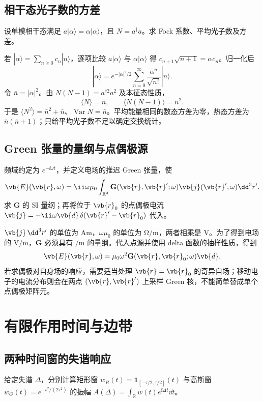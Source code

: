\subsection*{相干态光子数的方差}
设单模相干态满足 \(a|\alpha\rangle=\alpha|\alpha\rangle\)，且 \(N=a^\dagger a\)。求 Fock 系数、平均光子数及方差。

若 \(|\alpha\rangle=\sum_{n\ge0}c_n|n\rangle\)，逐项比较 \(a|\alpha\rangle\) 与 \(\alpha|\alpha\rangle\) 得 \(c_{n+1}\sqrt{n+1}=\alpha c_n\)。归一化后
\[
|\alpha\rangle=e^{-|\alpha|^2/2}
\sum_{n=0}^\infty\frac{\alpha^n}{\sqrt{n!}}|n\rangle.
\]
令 \(\bar n=|\alpha|^2\)。由 \(N(N-1)=a^{\dagger2}a^2\) 及本征态性质，
\[
\langle N\rangle=\bar n,\qquad
\langle N(N-1)\rangle=\bar n^2.
\]
于是 \(\langle N^2\rangle=\bar n^2+\bar n\)、\(\operatorname{Var}N=\bar n\)。平均能量相同的数态方差为零，热态方差为 \(\bar n(\bar n+1)\)；只给平均光子数不足以确定交换统计。

\subsection*{Green 张量的量纲与点偶极源}
频域约定为 \(e^{-\ii\omega t}\)，并定义电场的推迟 Green 张量，使
\[
\vb{E}(\vb{r},\omega)=\ii\omega\mu_0
\int_{\mathbb R^3}\mathbf G(\vb{r},\vb{r}';\omega)
\vb{j}(\vb{r}',\omega)\dd^3r'.
\]
求 \(\mathbf G\) 的 SI 量纲；再将位于 \(\vb{r}_0\) 的点偶极电流 \(\vb{j}=-\ii\omega\vb{d}\,\delta(\vb{r}'-\vb{r}_0)\) 代入。

\(\vb{j}\,\dd^3r'\) 的单位为 \(\si{\ampere\meter}\)，\(\omega\mu_0\) 的单位为 \(\si{\ohm\per\meter}\)，两者相乘是 \(\si{\volt}\)。为了得到电场的 \(\si{\volt\per\meter}\)，\(\mathbf G\) 必须具有 \(\si{\per\meter}\) 的量纲。代入点源并使用 delta 函数的抽样性质，得到
\[
\vb{E}(\vb{r},\omega)=\mu_0\omega^2
\mathbf G(\vb{r},\vb{r}_0;\omega)\vb{d}.
\]
若求偶极对自身场的响应，需要适当处理 \(\vb{r}=\vb{r}_0\) 的奇异自场；移动电子的电流分布则会在两点 \((\vb{r},\vb{r}')\) 上采样 Green 核，不能简单替成单个点偶极矩阵元。

\section{有限作用时间与边带}

\subsection*{两种时间窗的失谐响应}
给定失谐 \(\Delta\)，分别计算矩形窗 \(w_R(t)=\mathbf1_{[-\tau/2,\tau/2]}(t)\) 与高斯窗 \(w_G(t)=e^{-t^2/(2\tau^2)}\) 的振幅 \(A(\Delta)=\int_{\mathbb R}w(t)e^{\ii\Delta t}\dd t\)。


